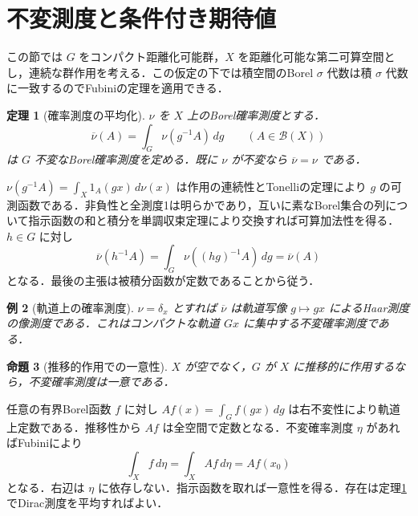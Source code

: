 \documentclass[a5paper,10pt,onecolumn]{jsarticle}
\makeatletter
\theoremstyle{mathnotetheorem}
\newtheorem{theorem}{定理}[section]
\newtheorem{proposition}[theorem]{命題}
\newtheorem{example}[theorem]{例}
\renewcommand{\proofname}{証明}
\renewenvironment{proof}[1][\proofname]{%
  \par\pushQED{\qed}\normalfont\topsep4\p@\@plus2\p@\relax
  \trivlist\item[\hskip\labelsep\bfseries #1]\ignorespaces
}{\popQED\endtrivlist\@endpefalse}
\makeatother
\begin{document}
\section{不変測度と条件付き期待値}
この節では $G$ をコンパクト距離化可能群，$X$ を距離化可能な第二可算空間とし，連続な群作用を考える．この仮定の下では積空間のBorel $\sigma$ 代数は積 $\sigma$ 代数に一致するのでFubiniの定理を適用できる．
\begin{theorem}[確率測度の平均化]\label{measureavg}
$\nu$ を $X$ 上のBorel確率測度とする．
\[
 \overline\nu(A)=\int_G\nu(g^{-1}A)\,dg
 \qquad(A\in\mathcal B(X))
\]
は $G$ 不変なBorel確率測度を定める．既に $\nu$ が不変なら $\overline\nu=\nu$ である．
\end{theorem}
\begin{proof}
$\nu(g^{-1}A)=\int_X1_A(gx)\,d\nu(x)$ は作用の連続性とTonelliの定理により $g$ の可測函数である．非負性と全測度1は明らかであり，互いに素なBorel集合の列について指示函数の和と積分を単調収束定理により交換すれば可算加法性を得る．$h\in G$ に対し
\[
 \overline\nu(h^{-1}A)=\int_G\nu((hg)^{-1}A)\,dg
 =\overline\nu(A)
\]
となる．最後の主張は被積分函数が定数であることから従う．
\end{proof}
\begin{example}[軌道上の確率測度]
$\nu=\delta_x$ とすれば $\overline\nu$ は軌道写像 $g\mapsto gx$ によるHaar測度の像測度である．これはコンパクトな軌道 $Gx$ に集中する不変確率測度である．
\end{example}
\begin{proposition}[推移的作用での一意性]\label{trans}
$X$ が空でなく，$G$ が $X$ に推移的に作用するなら，不変確率測度は一意である．
\end{proposition}
\begin{proof}
任意の有界Borel函数 $f$ に対し $Af(x)=\int_G f(gx)\,dg$ は右不変性により軌道上定数である．推移性から $Af$ は全空間で定数となる．不変確率測度 $\eta$ があればFubiniにより
\[
 \int_X f\,d\eta=\int_X Af\,d\eta=Af(x_0)
\]
となる．右辺は $\eta$ に依存しない．指示函数を取れば一意性を得る．存在は定理\ref{measureavg}でDirac測度を平均すればよい．
\end{proof}
\end{document}

